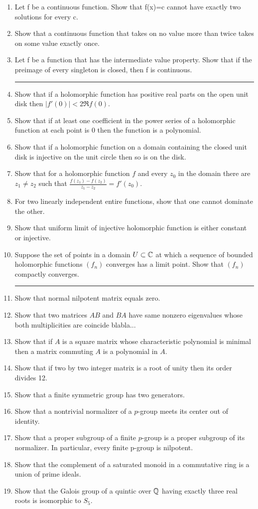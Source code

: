 \documentclass{article}
\begin{document}
\begin{enumerate}
\hrule
\item Let f be a continuous function. Show that f(x)=c cannot have exactly two solutions for every c.
\item Show that a continuous function that takes on no value more than twice takes on some value exactly once.
\item Let f be a function that has the intermediate value property. Show that if the preimage of every singleton is closed, then f is continuous.

\hrule
\item Show that if a holomorphic function has positive real parts on the open unit disk then $|f'(0)|<2\Re f(0)$.
\item Show that if at least one coefficient in the power series of a holomorphic function at each point is 0 then the function is a polynomial.
\item Show that if a holomorphic function on a domain containing the closed unit disk is injective on the unit circle then so is on the disk.
\item Show that for a holomorphic function $f$ and every $z_0$ in the domain there are $z_1\ne z_2$ such that $\frac{f(z_1)-f(z_2)}{z_1-z_2}=f'(z_0)$.
\item For two linearly independent entire functions, show that one cannot dominate the other.
\item Show that uniform limit of injective holomorphic function is either constant or injective.
\item Suppose the set of points in a domain $U\subset\mathbb{C}$ at which a sequence of bounded holomorphic functions $(f_n)$ converges has a limit point. Show that $(f_n)$ compactly converges.

\hrule
\item Show that normal nilpotent matrix equals zero.
\item Show that two matrices $AB$ and $BA$ have same nonzero eigenvalues whose both multiplicities are coincide blabla...
\item Show that if $A$ is a square matrix whose characteristic polynomial is minimal then a matrix commuting $A$ is a polynomial in $A$.
\item Show that if two by two integer matrix is a root of unity then its order divides 12.
\item Show that a finite symmetric group has two generators.
\item Show that a nontrivial normalizer of a $p$-group meets its center out of identity.
\item Show that a proper subgroup of a finite $p$-group is a proper subgroup of its normalizer. In particular, every finite p-group is nilpotent.
\item Show that the complement of a saturated monoid in a commutative ring is a union of prime ideals.
\item Show that the Galois group of a quintic over $\mathbb{Q}$ having exactly three real roots is isomorphic to $S_5$.


\end{enumerate}
\end{document}

